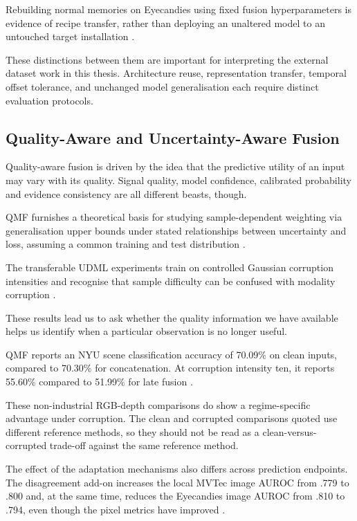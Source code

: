 Rebuilding normal memories on Eyecandies using fixed fusion hyperparameters is evidence of recipe
transfer, rather than deploying an unaltered model to an untouched target installation
\parencite{P026,P033}.

These distinctions between them are important for interpreting the external dataset work in this
thesis. Architecture reuse, representation transfer, temporal offset tolerance, and unchanged model
generalisation each require distinct evaluation protocols.

\subsection{Quality-Aware and Uncertainty-Aware Fusion}

Quality-aware fusion is driven by the idea that the predictive utility of an input may vary with its
quality. Signal quality, model confidence, calibrated probability and evidence consistency are all
different beasts, though.

QMF furnishes a theoretical basis for studying sample-dependent weighting via generalisation upper
bounds under stated relationships between uncertainty and loss, assuming a common training and test
distribution \parencite[Sections~3.1--3.2]{Zhang2023QMF}.

The transferable UDML experiments train on controlled Gaussian corruption intensities and recognise
that sample difficulty can be confused with modality corruption \parencite[PDF pp.~4--5, 9]{P022}.

These results lead us to ask whether the quality information we have available helps us identify
when a particular observation is no longer useful.

QMF reports an NYU scene classification accuracy of 70.09\% on clean inputs, compared to 70.30\% for
concatenation. At corruption intensity ten, it reports 55.60\% compared to 51.99\% for late fusion
\parencite[PDF p.~8, Table~1]{Zhang2023QMF}.

These non-industrial RGB-depth comparisons do show a regime-specific advantage under corruption. The
clean and corrupted comparisons quoted use different reference methods, so they should not be read
as a clean-versus-corrupted trade-off against the same reference method.

The effect of the adaptation mechanisms also differs across prediction endpoints. The disagreement
add-on increases the local MVTec image AUROC from .779 to .800 and, at the same time, reduces the
Eyecandies image AUROC from .810 to .794, even though the pixel metrics have improved \parencite[PDF
pp.~10--11, Tables~4--5]{P033}.

